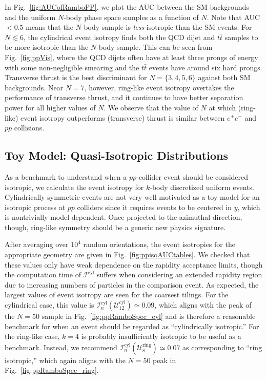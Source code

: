 \documentclass[letterpaper,11pt]{article}
\newcommand{\iso}[2]{\mathcal{I}^\text{#1}_{#2}}
\DeclareRobustCommand{\Fig}[1]{Fig.~\ref{#1}}
\begin{document}
In \Fig{fig:AUCofRamboPP}, we plot the AUC between the SM backgrounds and the uniform $N$-body phase space samples as a function of $N$.
%
Note that AUC $< 0.5$ means that the $N$-body sample is \emph{less} isotropic than the SM events.
%
For $N \lesssim 6$, the cylindrical event isotropy finds both the QCD dijet and $t\bar{t}$ samples to be more isotropic than the $N$-body sample. 
%
This can be seen from \Fig{fig:ppVis}, where the QCD dijets often have at least three prongs of energy with some non-negligible smearing and the $t\bar{t}$ events have around six hard prongs. 
%
Transverse thrust is the best discriminant for $N=\{3,4,5,6\}$ against both SM backgrounds.
%
Near $N=7$, however, ring-like event isotropy overtakes the performance of transverse thrust, and it continues to have better separation power for all higher values of $N$.
%
We observe that the value of $N$ at which (ring-like) event isotropy outperforms (transverse) thrust is similar between $e^+e^-$ and $pp$ collisions.


\subsection{Toy Model: Quasi-Isotropic Distributions}
\label{subsec:pp_kbody}





As a benchmark to understand when a $pp$-collider event should be considered isotropic, we calculate the event isotropy for $k$-body discretized uniform events. 
%
Cylindrically symmetric events are not very well motivated as a toy model for an isotropic process at $pp$ colliders since it requires events to be centered in $y$, which is nontrivially model-dependent. 
%
Once projected to the azimuthal direction, though, ring-like symmetry should be a generic new physics signature.


After averaging over $10^4$ random orientations, the event isotropies for the appropriate geometry are given in \Fig{fig:ppisoAUCtables}. 
%
We checked that these values only have weak dependence on the rapidity acceptance limits, though the computation time of $\iso{cyl}{}$ suffers when considering an extended rapidity region due to increasing numbers of particles in the comparison event.
%
As expected, the largest values of event isotropy are seen for the coarsest tilings.
%
For the cylindrical case, this value is $\iso{cyl}{n}(\mathcal{U}^\text{cyl}_{12}) \simeq 0.09$, which aligns with the peak of the $N = 50$ sample in \Fig{fig:ppRamboSpec_cyl} and is therefore a reasonable benchmark for when an event should be regarded as ``cylindrically isotropic.''
%
For the ring-like case, $k = 4$ is probably insufficiently isotropic to be useful as a benchmark.
%
Instead, we recommend $\iso{cyl}{n}(\mathcal{U}^\text{ring}_{8}) \simeq 0.07$ as corresponding to ``ring isotropic,'' which again aligns with the $N = 50$ peak in \Fig{fig:ppRamboSpec_ring}.
\end{document}
